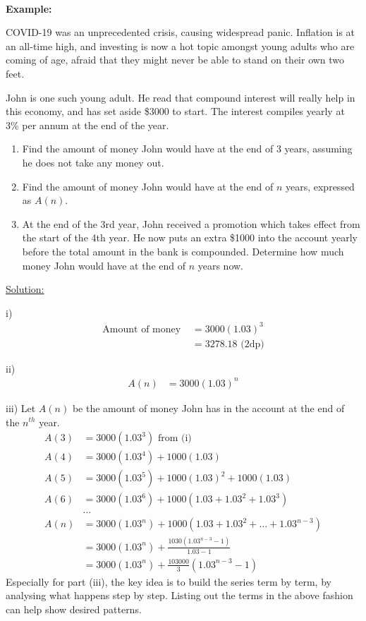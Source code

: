 \documentclass[12pt, a4paper, titlepage]{article}
\begin{document}
\textbf{\\ Example:}

COVID-19 was an unprecedented crisis, causing widespread panic. Inflation is at an all-time high, and investing is now a hot topic amongst young adults who are coming of age, afraid that they might never be able to stand on their own two feet.

John is one such young adult. He read that compound interest will really help in this economy, and has set aside \$3000 to start. The interest compiles yearly at 3\% per annum at the end of the year.

\begin{enumerate}[label=(\roman*)]
    \item Find the amount of money John would have at the end of 3 years, assuming he does not take any money out.
    \item Find the amount of money John would have at the end of $n$ years, expressed as $A(n)$.
    \item At the end of the 3rd year, John received a promotion which takes effect from the start of the 4th year. He now puts an extra \$1000 into the account yearly before the total amount in the bank is compounded. Determine how much money John would have at the end of $n$ years now.
\end{enumerate}

\underline{Solution:}

i)
\begin{align*}
    \text{Amount of money } &= 3000(1.03)^3 \\
    &= 3278.18 \text{ (2dp)}
\end{align*}

ii)
\begin{align*}
    A(n) &= 3000(1.03)^n
\end{align*}

iii)
Let $A(n)$ be the amount of money John has in the account at the end of the $n^{th}$ year.
\begin{align*}
    A(3) &= 3000(1.03^3) \text{ from (i)} \\
    A(4) &= 3000(1.03^4) + 1000(1.03) \\
    A(5) &= 3000(1.03^5) + 1000(1.03)^2 + 1000(1.03) \\
    A(6) &= 3000(1.03^6) + 1000(1.03 + 1.03^2 + 1.03^3) \\
    &\dots \\
    A(n) &= 3000(1.03^n) + 1000(1.03 + 1.03^2 + \dots + 1.03^{n - 3}) \\
    &= 3000(1.03^n) + \frac{1030(1.03^{n - 3} - 1)}{1.03 - 1} \\
    &= 3000(1.03^n) + \frac{103000}{3}(1.03^{n - 3} - 1)
\end{align*}
Especially for part (iii), the key idea is to build the series term by term, by analysing what happens step by step. Listing out the terms in the above fashion can help show desired patterns.
\end{document}

